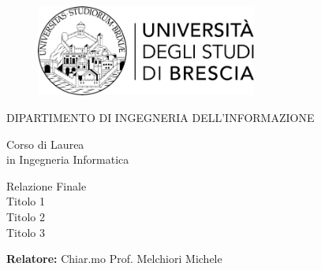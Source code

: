 \begin{titlepage}
    \begin{center}

        \begin{figure}[t]
            \centering
            \includegraphics[width=72.4mm,height=30mm]{img/logo_unibs}
        \end{figure}

        \vspace*{10mm}

        {\fontsize{17}{17}\selectfont
        DIPARTIMENTO DI INGEGNERIA DELL'INFORMAZIONE\\
        }

        \vspace*{10mm}

        {\fontsize{17}{17}\selectfont
        Corso di Laurea\\
        in Ingegneria Informatica\\

        }

        \vspace*{20mm}

        {\fontsize{20}{20}\selectfont
        Relazione Finale\\
        Titolo 1\\
        Titolo 2\\
        Titolo 3\\
        }

    \end{center}

    \vfill

    \begin{flushleft}
    {\fontsize{17}{17}\selectfont
    \textbf{Relatore:} Chiar.mo Prof. Melchiori Michele
    }

    \end{flushleft}

    \vspace*{5mm}


\end{titlepage}
